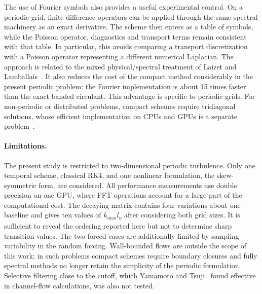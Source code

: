 \documentclass[11pt,a4paper]{article}
\begin{document}
The use of Fourier symbols also provides a useful experimental control. On a periodic grid, finite-difference operators can be applied through the same spectral machinery as an exact derivative. The scheme then enters as a table of symbols, while the Poisson operator, diagnostics and transport terms remain consistent with that table. In particular, this avoids comparing a transport discretization with a Poisson operator representing a different numerical Laplacian. The approach is related to the mixed physical/spectral treatment of Laizet and Lamballais~\cite{laizet2009}. It also reduces the cost of the compact method considerably in the present periodic problem: the Fourier implementation is about 15 times faster than the exact banded circulant. This advantage is specific to periodic grids. For non-periodic or distributed problems, compact schemes require tridiagonal solutions, whose efficient implementation on CPUs and GPUs is a separate problem~\cite{akkurt2025}.
\paragraph{Limitations.}
The present study is restricted to two-dimensional periodic turbulence. Only one temporal scheme, classical RK4, and one nonlinear formulation, the skew-symmetric form, are considered. All performance measurements use double precision on one GPU, where FFT operations account for a large part of the computational cost.
The decaying matrix contains four variations about one baseline and gives ten values of $k_{\max}l_\eta$ after considering both grid sizes. It is sufficient to reveal the ordering reported here but not to determine sharp transition values. The two forced cases are additionally limited by sampling variability in the random forcing. Wall-bounded flows are outside the scope of this work; in such problems compact schemes require boundary closures and fully spectral methods no longer retain the simplicity of the periodic formulation. Selective filtering close to the cutoff, which Yamamoto and Tsuji~\cite{yamamoto2026} found effective in channel-flow calculations, was also not tested.
\end{document}
